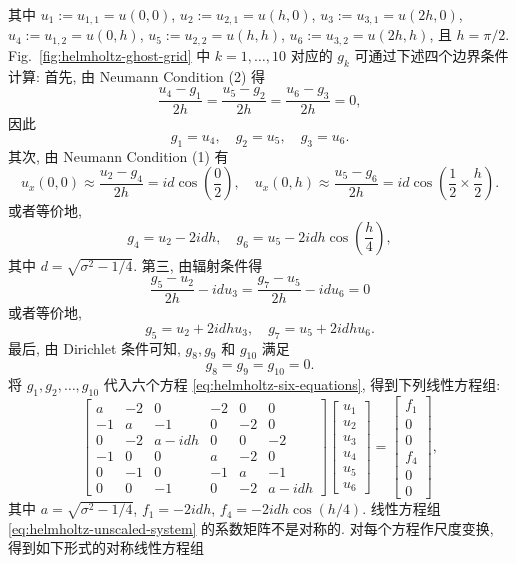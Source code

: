 {其中 $u_1:=u_{1,1}=u(0,0)$, $u_2:=u_{2,1}=u(h,0)$, $u_3:=u_{3,1}=u(2h,0)$, $u_4:=u_{1,2}=u(0,h)$, $u_5:=u_{2,2}=u(h,h)$, $u_6:=u_{3,2}=u(2h,h)$, 且 $h=\pi/2$. Fig.\ \ref{fig:helmholtz-ghost-grid} 中 $k=1,\ldots,10$ 对应的 $g_k$ 可通过下述四个边界条件计算: 首先, 由 Neumann Condition (2) 得}
\[\frac{u_4-g_1}{2h}=\frac{u_5-g_2}{2h}=\frac{u_6-g_3}{2h}=0,\]
{因此}
\[g_1=u_4,\quad g_2=u_5,\quad g_3=u_6.\]
{其次, 由 Neumann Condition (1) 有}
\[u_x(0,0)\approx\frac{u_2-g_4}{2h}=id\cos\left(\frac02\right),\quad
u_x(0,h)\approx\frac{u_5-g_6}{2h}=id\cos\left(\frac12\times\frac h2\right).\]
{或者等价地,}
\[g_4=u_2-2idh,\quad g_6=u_5-2idh\cos\left(\frac h4\right),\]
{其中 $d=\sqrt{\sigma^2-1/4}$. 第三, 由辐射条件得}
\[\frac{g_5-u_2}{2h}-idu_3=\frac{g_7-u_5}{2h}-idu_6=0\]
{或者等价地,}
\[g_5=u_2+2idhu_3,\quad g_7=u_5+2idhu_6.\]
{最后, 由 Dirichlet 条件可知, $g_8,g_9$ 和 $g_{10}$ 满足}
\[g_8=g_9=g_{10}=0.\]
{将 $g_1,g_2,\ldots,g_{10}$ 代入六个方程 \eqref{eq:helmholtz-six-equations}, 得到下列线性方程组:}
\begin{equation}\label{eq:helmholtz-unscaled-system}
\begin{bmatrix}
a&-2&0&-2&0&0\\-1&a&-1&0&-2&0\\0&-2&a-idh&0&0&-2\\
-1&0&0&a&-2&0\\0&-1&0&-1&a&-1\\0&0&-1&0&-2&a-idh
\end{bmatrix}
\begin{bmatrix}u_1\\u_2\\u_3\\u_4\\u_5\\u_6\end{bmatrix}
=\begin{bmatrix}f_1\\0\\0\\f_4\\0\\0\end{bmatrix},
\end{equation}
{其中 $a=\sqrt{\sigma^2-1/4}$, $f_1=-2idh$, $f_4=-2idh\cos(h/4)$. 线性方程组 \eqref{eq:helmholtz-unscaled-system} 的系数矩阵不是对称的. 对每个方程作尺度变换, 得到如下形式的对称线性方程组}
